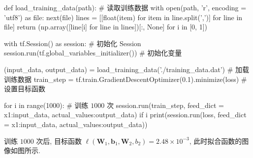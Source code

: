 \begin{frame}[fragile]{\insertsection}{\insertsubsection}
{}
\end{frame}

\begin{frame}[fragile]{\insertsection}{\insertsubsection}
\begin{pythoncode}[fontsize = \fontsize{8}{8}\selectfont]
def load_training_data(path): # 读取训练数据
    with open(path, 'r', encoding = 'utf8') as file:
        next(file)
        lines = [[float(item) for item in line.split(',')] for line in file]
    return (np.array([line[i] for line in lines])[:, None] for i in [0, 1])

with tf.Session() as session: # 初始化 Session
  session.run(tf.global_variables_initializer()) # 初始化变量

  (input_data, output_data) = load_training_data('./training_data.dat') # 加载训练数据
  train_step = tf.train.GradientDescentOptimizer(0.1).minimize(loss) # 设置目标函数

  for i in range(1000): # 训练 $1000$ 次
    session.run(train_step, feed_dict = {x1:input_data, actual_values:output_data})
    if i %
      print(session.run(loss, feed_dict = {x1:input_data, actual_values:output_data}))
\end{pythoncode}
\end{frame}

\begin{frame}{\insertsection}{\insertsubsection}
训练 $1000$ 次后, 目标函数 $\ell(\bm{W}_1, \bm{b}_1, \bm{W}_2, b_2) = 2.48\times 10^{-3}$, 此时拟合函数的图像如图所示.\vspace{10pt}

\end{frame}


